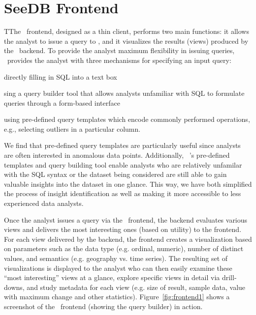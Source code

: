 \section{SeeDB Frontend}
\label{subsec:seedb_frontend}

TThe \SeeDB\ frontend, designed as a thin client, performs two main functions: it
allows the analyst to issue a query to \SeeDB, 
and it visualizes the results (views) produced by the \SeeDB\
backend.
To provide the analyst maximum flexibility in issuing queries, \SeeDB\
provides the analyst with three
mechanisms for specifying an input query: 
\vspace{5 mm}

 \squishlist
   \item directly filling in SQL into a text box
   \item sing a query builder tool that allows analysts
unfamiliar with SQL to formulate queries through a form-based interface
   \item using pre-defined query templates which encode commonly performed operations,
e.g., selecting outliers in a particular column. 
 \squishend

\vspace{5 mm}


We find that pre-defined query templates are particularly useful since analysts are often interested in anomalous data points. Additionally, \SeeDB\
's pre-defined templates and query building tool enable analysts who are relatively unfamilar with the SQL syntax or the dataset being considered are still able to gain valuable insights into the dataset in one glance. This way, we have both simplified the process of insight identification as well as making it more accessible to less experienced data analysts.


Once the analyst issues a query via the \SeeDB\ frontend, the backend
evaluates various views and delivers the most interesting ones (based on
utility) to the frontend.
For each view delivered by the backend, the frontend creates a visualization
based on parameters such as the data
type (e.g. ordinal, numeric), number of distinct values, and semantics (e.g.
geography vs. time series).
The resulting set of visualizations is displayed to the analyst who can then
easily examine these ``most interesting'' views at a glance, explore specific views in
detail via drill-downs, 
and study metadata for each view (e.g. size of result, sample data, value with
maximum change and other statistics). 
Figure~\ref{fig:frontend1} shows a screenshot of the \SeeDB\ frontend (showing
the query builder) in action.

